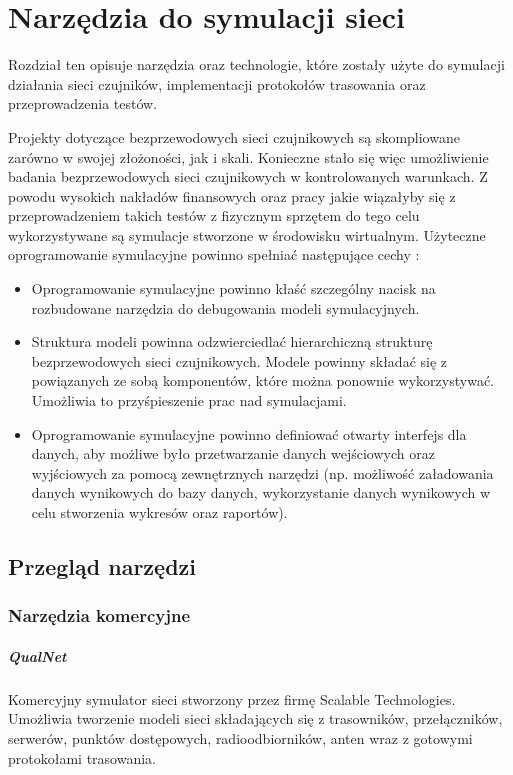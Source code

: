 \chapter{Narzędzia do symulacji sieci}
Rozdział ten opisuje narzędzia oraz technologie, które zostały użyte do symulacji działania sieci czujników, implementacji protokołów trasowania oraz przeprowadzenia testów.

Projekty dotyczące  bezprzewodowych sieci czujnikowych są skompliowane zarówno w swojej złożoności, jak i skali. Konieczne stało się więc umożliwienie badania bezprzewodowych sieci czujnikowych w kontrolowanych warunkach. Z powodu wysokich nakładów finansowych oraz pracy jakie wiązałyby się z przeprowadzeniem takich testów z fizycznym sprzętem do tego celu wykorzystywane są symulacje stworzone w środowisku wirtualnym. Użyteczne oprogramowanie symulacyjne powinno spełniać  następujące cechy \cite{Xian2008}:
\begin{itemize}
	\item Oprogramowanie symulacyjne powinno kłaść szczególny nacisk na rozbudowane narzędzia do debugowania modeli symulacyjnych.
	
	\item Struktura modeli powinna odzwierciedlać hierarchiczną strukturę bezprzewodowych sieci czujnikowych. Modele powinny składać się z powiązanych ze sobą komponentów, które można ponownie wykorzystywać. Umożliwia to przyśpieszenie prac nad symulacjami.
	
	\item Oprogramowanie symulacyjne powinno definiować otwarty interfejs dla danych, aby możliwe było przetwarzanie danych wejściowych oraz wyjściowych za pomocą zewnętrznych narzędzi (np. możliwość załadowania danych wynikowych do bazy danych, wykorzystanie danych wynikowych w celu stworzenia wykresów oraz raportów).
\end{itemize}
\section{Przegląd narzędzi}
\cite{Xian2008}
\cite{Nayyar2015}
\subsection{Narzędzia komercyjne}
\paragraph{QualNet}
Komercyjny symulator sieci stworzony przez firmę Scalable Technologies. Umożliwia tworzenie modeli sieci składających się z trasowników, przełączników, serwerów, punktów dostępowych, radioodbiorników, anten wraz z gotowymi protokołami trasowania.

